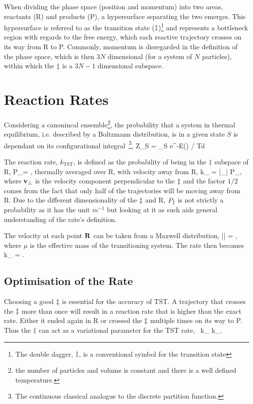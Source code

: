 When dividing the phase space (position and momentum) into two areas, reactants (R) and products (P), a hypersurface separating the two emerges.
This hypersurface is referred to as the transition state ($\ddagger$)\footnote{The double dagger, $\ddagger$, is a conventional symbol for the transition state} and represents a bottleneck region with regards to the free energy, which each reactive trajectory crosses on its way from R to P.
Commonly, momentum is disregarded in the definition of the phase space, which is then $3N$ dimensional (for a system of $N$ particles), within which the $\ddagger$ is a $3N-1$ dimensional subspace.

\section{Reaction Rates}
Considering a canonincal ensemble\footnote{the number of particles and volume is constant and there is a well defined temperature.}, the probability that a system in thermal equilibrium, i.e. described by a Boltzmann distribution, is in a given state $S$ is dependant on its configurational integral~\footnote{The continuous classical analogue to the discrete partition function.},
Z_S = \int_S e^{-E(\vR) / \kB T}d\vR
\eeq

The reaction rate, $k_\text{TST}$, is defined as the probability of being in the $\ddagger$ subspace of $\text{R}$,
P_\ts = ,
\eeq
thermally averaged over R, with velocity away from R, %
{}
k_ = |_\perp| P_\ts,
\eeq
where ${\mathrm{\mathbf{\bm{v}}}}_\perp$ is the velocity component perpendicular to the $\ddagger$ and the factor $1/2$ comes from the fact that only half of the trajectories will be moving away from R.
Due to the different dimensionality of the $\ddagger$ and R, $P_\ddagger$ is not strictly a probability as it has the unit $\unit{m^{-1}}$ but looking at it as such aids general understanding of the rate's definition.

The velocity at each point ${\mathrm{\mathbf{\bm{R}}}}$ can be taken from a Maxwell distribution,
\langle || \rangle = ,
\eeq
where $\mu$ is the effective mass of the transitioning system.
The rate then becomes
k_ =  .
\eeq

\subsection{Optimisation of the Rate}
Choosing a good $\ddagger$ is essential for the accuracy of TST.
A trajectory that crosses the $\ddagger$ more than once will result in a reaction rate that is higher than the exact rate.
Either it ended again in R or crossed the $\ddagger$ multiple times on its way to P.
Thus the $\ddagger$ can act as a variational parameter for the TST rate,~\cite{vtst-1938, vtst-review-1984, vtst-2005}
k_ \ge k_.
\eeq


